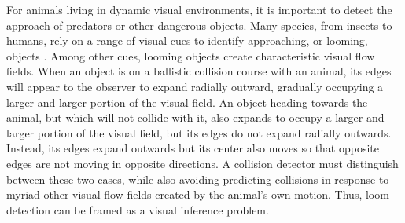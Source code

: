 \documentclass[9pt,lineno]{elife}
\begin{document}



For animals living in dynamic visual environments, it is important to detect the approach of predators or other dangerous objects. Many species, from insects to humans, rely on a range of visual cues to identify approaching, or looming, objects \citep{regan1978looming,sun1998computation,gabbiani1999computation,card2008visually,munch2009approach,temizer2015visual}. Among other cues, looming objects create characteristic visual flow fields. When an object is on a ballistic collision course with an animal, its edges will appear to the observer to expand radially outward, gradually occupying a larger and larger portion of the visual field. An object heading towards the animal, but which will not collide with it, also expands to occupy a larger and larger portion of the visual field, but its edges do not expand radially outwards. Instead, its edges expand outwards but its center also moves so that opposite edges are not moving in opposite directions. A collision detector must distinguish between these two cases, while also avoiding predicting collisions in response to myriad other visual flow fields created by the animal's own motion. Thus, loom detection can be framed as a visual inference problem.  
\end{document}
